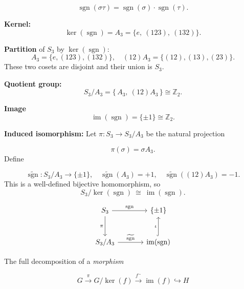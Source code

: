 \documentclass[12pt]{article}
\begin{document}
$$
\operatorname{sgn}(\sigma \tau) = \operatorname{sgn}(\sigma) \cdot \operatorname{sgn}(\tau).
$$

\textbf{Kernel:}
$$
\ker(\operatorname{sgn}) = A_3 = \{ e,\ (123),\ (132) \}.
$$

\textbf{Partition }of $S_3$ by $\ker(\operatorname{sgn})$:
$$
A_3 = \{ e, (123), (132) \}, \quad (12)A_3 = \{ (12), (13), (23) \}.
$$
These two cosets are disjoint and their union is $S_3$.

\textbf{Quotient group:}
$$
S_3 / A_3 = \{\, A_3,\ (12)A_3 \,\} \cong \mathbb{Z}_2.
$$

\textbf{Image}
$$
\operatorname{im}(\operatorname{sgn}) = \{\pm 1\} \cong \mathbb{Z}_2.
$$

\textbf{Induced isomorphism:} Let $\pi : S_3 \to S_3/A_3$ be the natural projection

$$
\pi(\sigma) = \sigma A_3.
$$
Define

$$
\widetilde{\operatorname{sgn}} : S_3 / A_3 \longrightarrow \{\pm 1\}, \quad 
\widetilde{\operatorname{sgn}}(A_3) = +1, \quad \widetilde{\operatorname{sgn}}((12)A_3) = -1.
$$
This is a well-defined bijective homomorphism, so
$$
S_3 / \ker(\operatorname{sgn}) \ \cong \ \operatorname{im}(\operatorname{sgn}).
$$

$$
\begin{tikzcd}[row sep=large, column sep=large]
	S_3 \arrow[r, "\operatorname{sgn}"] \arrow[d, "\pi"'] 
	& \{\pm 1\} \\
	S_3 / A_3 \arrow[r, "\widetilde{\operatorname{sgn}}"] 
	& \operatorname{im}(\operatorname{sgn}) \arrow[u, hook, "\iota"]
\end{tikzcd}
$$


The full decomposition of a \textit{morphism} 

$$
G \xrightarrow{\pi} G/\ker(f) \xrightarrow{f^{\sim}} \operatorname{im}(f) \hookrightarrow H
$$
\end{document}

